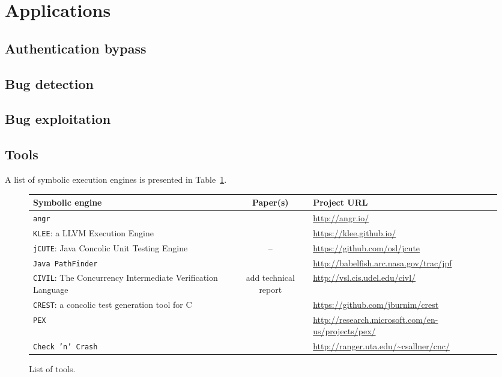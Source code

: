 
\section{Applications}

\subsection{Authentication bypass}
\cite{FIRMALICE-NDSS15}

\subsection{Bug detection}
\cite{DRILLER-NDSS16}

\subsection{Bug exploitation}
\cite{MAYHEM-SP12}

\subsection{Tools}
A list of symbolic execution engines is presented in Table~\ref{tab:symbolic-engines}.

\begin{figure}[t]
  \centering
  \begin{adjustbox}{width=1\columnwidth}
  \begin{small}
  \begin{tabular}{| l || c || l |}
    \hline      
    Symbolic engine & Paper(s) & Project URL  \\ \hline\hline
    {\tt angr} & \cite{FIRMALICE-NDSS15} & \url{http://angr.io/} \\
    {\tt KLEE}: a LLVM Execution Engine & \cite{KLEE-OSDI08} & \url{https://klee.github.io/} \\
    {\tt jCUTE}: Java Concolic Unit Testing Engine & -- & \url{https://github.com/osl/jcute} \\
    {\tt Java PathFinder} & \cite{PATHFINDER-ASE10} & \url{http://babelfish.arc.nasa.gov/trac/jpf}\\
    {\tt CIVIL}: The Concurrency Intermediate Verification Language & add technical report & \url{http://vsl.cis.udel.edu/civl/}\\
    {\tt CREST}: a concolic test generation tool for C & \cite{CREST-ASE08} & \url{https://github.com/jburnim/crest} \\
    {\tt PEX} & \cite{PEX-TAP08} & \url{http://research.microsoft.com/en-us/projects/pex/} \\
    {\tt Check 'n' Crash} & \cite{CS-ICSE05} & \url{http://ranger.uta.edu/~csallner/cnc/}\\
    \hline  
  \end{tabular}
  \end{small}
  \end{adjustbox}
  \caption{List of tools.}
  \label{tab:symbolic-engines}
\end{figure}